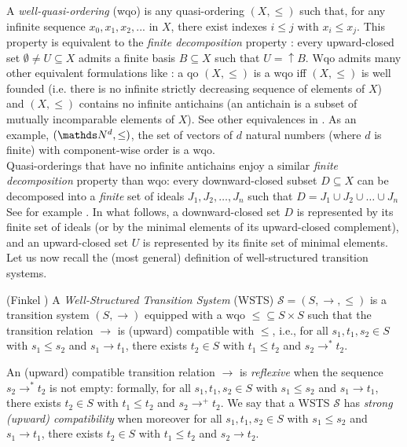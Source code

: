 \documentclass[runningheads]{llncs}
\begin{document}
 A {\em well-quasi-ordering} (wqo) is any quasi-ordering $(X,\leq)$ such that, for any infinite sequence $x_0, x_1, x_2, ...$ in $X$, there exist indexes $i \leq j$ with $x_i \leq  x_j$. This property is equivalent to the \emph{finite decomposition} property : every upward-closed set $\emptyset \neq U \subseteq X$ admits a finite basis $B \subseteq X$ such that $U=\mathop{\uparrow} B$.
%
%
%
Wqo admits many other equivalent formulations like : a qo $(X,\leq)$ is a wqo iff $(X,\leq)$ is well founded (i.e. there is no infinite strictly decreasing sequence
of elements of $X$) and $(X,\leq)$ contains no infinite antichains (an antichain is a subset of mutually incomparable elements of $X$). See other equivalences in \cite{DBLP:phd/hal/Halfon18,schmitz:cel-00727025}. 
%
%
As an example, $(\N^d, \leq)$, the set of vectors of $d$ natural numbers (where $d$ is finite) with component-wise order is a wqo.\\
Quasi-orderings that have no 
infinite antichains
 enjoy a similar \emph{finite decomposition} property than wqo: every downward-closed subset $D \subseteq X$ can be decomposed into a \emph{finite} set of ideals $J_1, J_2, \ldots, J_n$ such that $D = J_1 \cup J_2 \cup \ldots \cup J_n$ See for example \cite{BFM-ic17}.
%
%
In what follows, a downward-closed set $D$ is represented by its finite set of ideals (or by the minimal elements of its upward-closed complement), and an upward-closed set $U$ is represented by its finite set of minimal elements. \\

\noindent
Let us now recall the (most general) definition of well-structured transition systems.
\begin{definition}(Finkel \cite{DBLP:journals/iandc/Finkel90})
A {\em Well-Structured Transition System} (WSTS)  $\mathscr{S}=(S, \rightarrow, \leq)$
is a transition system $(S, \rightarrow)$
equipped with a wqo ${\leq} \subseteq S \times S$ such that   
the transition relation $ \rightarrow$ is (upward) compatible with $\leq$, i.e., for all 
$s_1, t_1 , s_2 \in S$
	with $s_1 \leq s_2$  and $s_1 \rightarrow t_1$, there exists 
	$t_2 \in S$ with 
	$t_1 \leq t_2$ and $s_2 \rightarrow^{*} t_2$.
\end{definition}

An (upward) compatible transition relation $ \rightarrow$ is \emph{reflexive} when the sequence $s_2 \rightarrow^{*} t_2$ is not empty: formally,
for all 
$s_1, t_1 , s_2 \in S$
	with $s_1 \leq s_2$  and $s_1 \rightarrow t_1$, there exists 
	$t_2 \in S$ with 
	$t_1 \leq t_2$ and $s_2 \rightarrow^{+} t_2$.
%
We say that a WSTS $\mathscr{S}$ has \emph{strong (upward) compatibility} when moreover for all 
$s_1, t_1 , s_2 \in S$
	with $s_1 \leq s_2$  and $s_1 \rightarrow t_1$, there exists 
	$t_2 \in S$ with 
	$t_1 \leq t_2$ and $s_2 \rightarrow t_2$.
\end{document}
